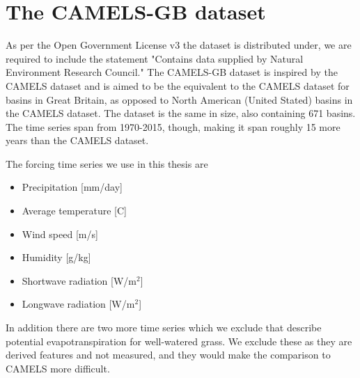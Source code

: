 \section{The CAMELS-GB dataset}
As per the Open Government License v3 the dataset is distributed under, we are required 
to include the statement "Contains data supplied by Natural Environment Research Council."
The CAMELS-GB dataset \citep{CAMELS_GB} is inspired by the CAMELS dataset and is 
aimed to be the equivalent to the CAMELS dataset for basins in Great Britain, 
as opposed to North American (United Stated) basins in the CAMELS dataset. The dataset is the same in size,
also containing 671 basins. The time series span from 1970-2015, though, making 
it span roughly 15 more years than the CAMELS dataset.

The forcing time series we use in this thesis are
\begin{itemize}
    \item Precipitation [mm/day]
    \item Average temperature [C\degree]
    \item Wind speed [m/s]
    \item Humidity [g/kg]
    \item Shortwave radiation [W/m$^2$]
    \item Longwave radiation [W/m$^2$]
\end{itemize}
In addition there are two more time series which we exclude that describe potential 
evapotranspiration for well-watered grass. We exclude these as they are derived 
features and not measured, and they would make the comparison to CAMELS more difficult.

